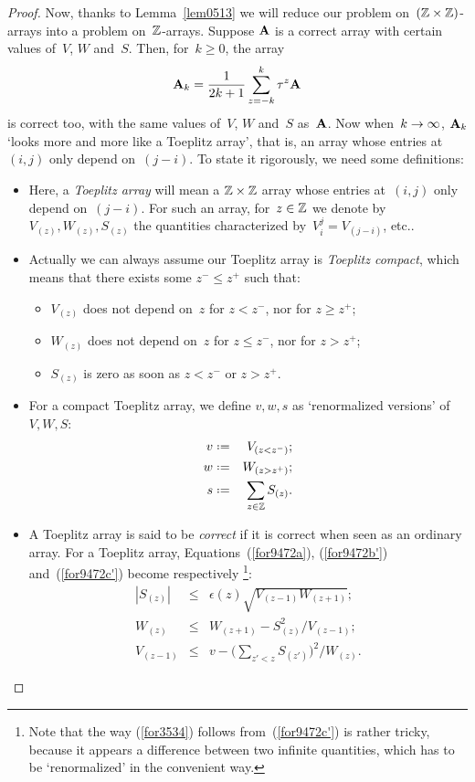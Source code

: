 \begin{proof}
Now, thanks to Lemma~\ref{lem0513} we will reduce our problem on~$(\mathbb{Z}\times\mathbb{Z})$-arrays
into a problem on~$\mathbb{Z}$-arrays.
Suppose $\mathbf{A}$ is a correct array with certain values of~$V$, $W$ and~$S$.
Then, for~$k \geq 0$, the array
\[\label{for3010} \mathbf{A}_k = \frac{1}{2k+1} \sum_{z=-k}^{k} \tau^z\mathbf{A} \]
is correct too, with the same values of~$V$, $W$ and~$S$ as~$\mathbf{A}$.
Now when~${k \to \infty}$, $\mathbf{A}_k$ `looks more and more like a Toeplitz array',
that is, an array whose entries at~$(i,j)$ only depend on~$(j-i)$.
To state it rigorously, we need some definitions:
%
\begin{Def}\label{def3111}\strut
\begin{itemize}
\item Here, a \emph{Toeplitz array} will mean a $\mathbb{Z}\times\mathbb{Z}$ array whose entries at~$(i,j)$
only depend on~$(j-i)$.
For such an array, for~$z\in\mathbb{Z}$ we denote by~$V_{(z)}, W_{(z)}, S_{(z)}$ the quantities
characterized by~$V_i^j = V_{(j-i)}$, etc..
%
\item Actually we can always assume our Toeplitz array is \emph{Toeplitz compact},
which means that there exists some $z^-\leq z^+$ such that:
\begin{itemize}
\item $V_{(z)}$ does not depend on~$z$ for $z<z^-$, nor for $z\geq z^+$;
\item $W_{(z)}$ does not depend on~$z$ for $z\leq z^-$, nor for $z>z^+$;
\item $S_{(z)}$ is zero as soon as $z<z^-$ or $z>z^+$.
\end{itemize}
%
\item For a compact Toeplitz array, we define $v, w, s$
as `renormalized versions' of~$V, W, S$:
\begin{eqnarray}
\label{for3162a} v &\coloneqq& V_{(z<z^-)} ;\\
\label{for3162b} w &\coloneqq& W_{(z>z^+)} ;\\
\label{for3162c} s &\coloneqq& \sum_{z\in\ZZ} S_{(z)} .
\end{eqnarray}
%
\item A Toeplitz array is said to be \emph{correct} if it is correct when seen as an ordinary array.
For a Toeplitz array, Equations~(\ref{for9472a}), (\ref{for9472b'}) and~(\ref{for9472c'})
become respectively%
\footnote{Note that the way (\ref{for3534}) follows from~(\ref{for9472c'}) is rather tricky,
because it appears a difference between two infinite quantities,
which has to be `renormalized' in the convenient way.}:
\begin{eqnarray}
\label{for5175}
|S_{(z)}| &\leq& \epsilon(z) \sqrt{V_{(z-1)}W_{(z+1)}} ; \\
\label{for5246}
W_{(z)} &\leq& W_{(z+1)} - S_{(z)}^2 \mathbin{\big/} V_{(z-1)} ; \\
\label{for3534}
V_{(z-1)} &\leq& v - \Big( \sum_{z'<z} S_{(z')} \Big)^{\!2} \mathbin{\Big/} W_{(z)} .
\end{eqnarray}
\end{itemize}
\end{Def}


\end{proof}
